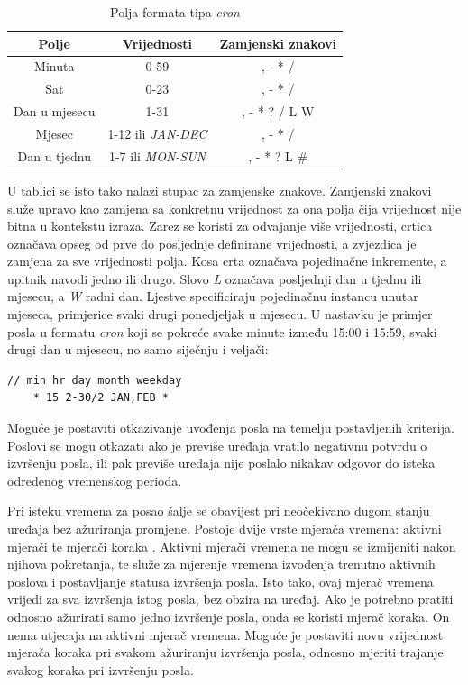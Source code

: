 \begin{table}[ht!]
	\centering
	\caption{Polja formata tipa \textit{cron} \cite{aws_docs}}
	\begin{tabular}{|c| c| c|}
		\hline
		\rowcolor{lightblue}  
		\textbf{Polje} & \textbf{Vrijednosti} & \textbf{Zamjenski znakovi} \\ \hline
		Minuta & 0-59 & , - * / \\ \hline
		Sat & 0-23 & , - * / \\ \hline
		Dan u mjesecu & 1-31 & , - * ? / L W \\ \hline
		Mjesec & 1-12 ili \textit{JAN-DEC} & , - * / \\ \hline
		Dan u tjednu & 1-7 ili \textit{MON-SUN} & , - * ? L \# \\ \hline
	\end{tabular}
	\label{table:cron}
\end{table}

U tablici se isto tako nalazi stupac za zamjenske znakove. Zamjenski znakovi  služe upravo kao zamjena sa konkretnu vrijednost za ona polja čija vrijednost nije bitna u kontekstu izraza. Zarez se koristi za odvajanje više vrijednosti, crtica označava opseg od prve do posljednje definirane vrijednosti, a zvjezdica je zamjena za sve vrijednosti polja. Kosa crta označava pojedinačne inkremente, a upitnik navodi jedno ili drugo. Slovo \textit{L} označava posljednji dan u tjednu ili mjesecu, a \textit{W} radni dan. Ljestve specificiraju pojedinačnu instancu unutar mjeseca, primjerice svaki drugi ponedjeljak u mjesecu. U nastavku je primjer posla u formatu \textit{cron} koji se pokreće svake minute između 15:00 i 15:59, svaki drugi dan u mjesecu, no samo siječnju i veljači:

\begin{lstlisting}[caption={Primjer formata tipa \textit{cron}}]
// min hr day month weekday
	* 15 2-30/2 JAN,FEB *
\end{lstlisting}

Moguće je postaviti otkazivanje uvođenja posla na temelju postavljenih kriterija. Poslovi se mogu otkazati ako je previše uređaja vratilo negativnu potvrdu o izvršenju posla, ili pak previše uređaja nije poslalo nikakav odgovor do isteka određenog vremenskog perioda. 

Pri isteku vremena  za posao šalje se obavijest pri neočekivano dugom stanju uređaja bez ažuriranja promjene. Postoje dvije vrste mjerača vremena: aktivni mjerači  te mjerači koraka . Aktivni mjerači vremena ne mogu se izmijeniti nakon njihova pokretanja, te služe za mjerenje vremena izvođenja trenutno aktivnih poslova i postavljanje statusa izvršenja posla. Isto tako, ovaj mjerač vremena vrijedi za sva izvršenja istog posla, bez obzira na uređaj. Ako je potrebno pratiti odnosno ažurirati samo jedno izvršenje posla, onda se koristi mjerač koraka. On nema utjecaja na aktivni mjerač vremena. Moguće je postaviti novu vrijednost mjerača koraka pri svakom ažuriranju izvršenja posla, odnosno mjeriti trajanje svakog koraka pri izvršenju posla. 

